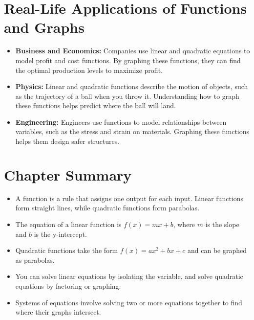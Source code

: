 \section{Real-Life Applications of Functions and Graphs}
\begin{itemize}
    \item \textbf{Business and Economics:} Companies use linear and quadratic equations to model profit and cost functions. By graphing these functions, they can find the optimal production levels to maximize profit.
    \item \textbf{Physics:} Linear and quadratic functions describe the motion of objects, such as the trajectory of a ball when you throw it. Understanding how to graph these functions helps predict where the ball will land.
    \item \textbf{Engineering:} Engineers use functions to model relationships between variables, such as the stress and strain on materials. Graphing these functions helps them design safer structures.
\end{itemize}

\section{Chapter Summary}
\begin{itemize}
    \item A function is a rule that assigns one output for each input. Linear functions form straight lines, while quadratic functions form parabolas.
    \item The equation of a linear function is \( f(x) = mx + b \), where \( m \) is the slope and \( b \) is the y-intercept.
    \item Quadratic functions take the form \( f(x) = ax^2 + bx + c \) and can be graphed as parabolas.
    \item You can solve linear equations by isolating the variable, and solve quadratic equations by factoring or graphing.
    \item Systems of equations involve solving two or more equations together to find where their graphs intersect.
\end{itemize}


